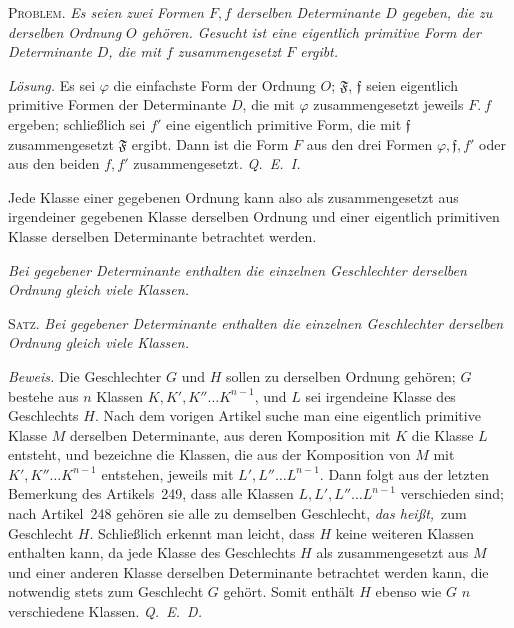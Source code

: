\textsc{Problem.} \textit{Es seien zwei Formen $F,f$ derselben Determinante $D$ gegeben, die zu derselben Ordnung $O$ gehören. Gesucht ist eine eigentlich primitive Form der Determinante $D$, die mit $f$ zusammengesetzt $F$ ergibt.}

\textit{Lösung.} Es sei $\varphi$ die einfachste Form der Ordnung $O$; $\mathfrak{F}$, $\mathfrak{f}$ seien eigentlich primitive Formen der Determinante $D$, die mit $\varphi$ zusammengesetzt jeweils $F.\ f$ ergeben; schließlich sei $f'$ eine eigentlich primitive Form, die mit $\mathfrak{f}$ zusammengesetzt $\mathfrak{F}$ ergibt. Dann ist die Form $F$ aus den drei Formen $\varphi,\mathfrak{f},f'$ oder aus den beiden $f,f'$ zusammengesetzt. \textit{Q.~E.~I.}

Jede Klasse einer gegebenen Ordnung kann also als zusammengesetzt aus irgendeiner gegebenen Klasse derselben Ordnung und einer eigentlich primitiven Klasse derselben Determinante betrachtet werden.

\begin{center}
\textit{Bei gegebener Determinante enthalten die einzelnen Geschlechter derselben Ordnung gleich viele Klassen.}
\end{center}

\textsc{Satz.} \textit{Bei gegebener Determinante enthalten die einzelnen Geschlechter derselben Ordnung gleich viele Klassen.}

\textit{Beweis.} Die Geschlechter $G$ und $H$ sollen zu derselben Ordnung gehören; $G$ bestehe aus $n$ Klassen $K,K',K''\ldots K^{n-1}$, und $L$ sei irgendeine Klasse des Geschlechts $H$. Nach dem vorigen Artikel suche man eine eigentlich primitive Klasse $M$ derselben Determinante, aus deren Komposition mit $K$ die Klasse $L$ entsteht, und bezeichne die Klassen, die aus der Komposition von $M$ mit $K',K''\ldots K^{n-1}$ entstehen, jeweils mit $L',L''\ldots L^{n-1}$. Dann folgt aus der letzten Bemerkung des Artikels~249, dass alle Klassen $L,L',L''\ldots L^{n-1}$ verschieden sind; nach Artikel~248 gehören sie alle zu demselben Geschlecht, \textit{das heißt,}\ zum Geschlecht $H$. Schließlich erkennt man leicht, dass $H$ keine weiteren Klassen enthalten kann, da jede Klasse des Geschlechts $H$ als zusammengesetzt aus $M$ und einer anderen Klasse derselben Determinante betrachtet werden kann, die notwendig stets zum Geschlecht $G$ gehört. Somit enthält $H$ ebenso wie $G$ $n$ verschiedene Klassen. \textit{Q.~E.~D.}
